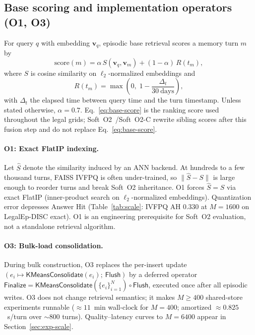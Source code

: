 \documentclass[preprint,12pt,authoryear]{elsarticle}
\begin{document}
\subsection{Base scoring and implementation operators (O1, O3)}\label{sec:o1o3}
For query $q$ with embedding $\mathbf{v}_q$, episodic base retrieval scores a memory turn $m$ by
\begin{equation}\label{eq:base-score}
\mathrm{score}(m)=\alpha\, S(\mathbf{v}_q,\mathbf{v}_m)+(1-\alpha)\, R(t_m),
\end{equation}
where $S$ is cosine similarity on $\ell_2$-normalized embeddings and
\begin{equation}
R(t_m)=\max\!\left(0,\;1-\frac{\Delta_t}{30\ \mathrm{days}}\right),
\end{equation}
with $\Delta_t$ the elapsed time between query time and the turn timestamp.
Unless stated otherwise, $\alpha{=}0.7$.
Eq.~\eqref{eq:base-score} is the ranking score used throughout the legal grids; Soft~O2~/Soft~O2-C rewrite sibling scores after this fusion step and do not replace Eq.~\eqref{eq:base-score}.

\paragraph{O1: Exact FlatIP indexing.}
Let $\widehat{S}$ denote the similarity induced by an ANN backend.
At hundreds to a few thousand turns, FAISS IVFPQ is often under-trained, so $\|\widehat{S}-S\|$ is large enough to reorder turns and break Soft~O2 inheritance.
O1 forces $\widehat{S}=S$ via exact FlatIP (inner-product search on $\ell_2$-normalized embeddings).
Quantization error depresses Answer Hit (Table~\ref{tab:scale}: IVFPQ AH $0.330$ at $M{=}1600$ on LegalEp-DISC exact).
O1 is an engineering prerequisite for Soft~O2 evaluation, not a standalone retrieval algorithm.

\paragraph{O3: Bulk-load consolidation.}
During bulk construction, O3 replaces the per-insert update
$(e_i\mapsto \mathsf{KMeansConsolidate}(e_i);\ \mathsf{Flush})$
by a deferred operator
$\mathsf{Finalize}=\mathsf{KMeansConsolidate}(\{e_i\}_{i=1}^{N})\circ\mathsf{Flush}$,
executed once after all episodic writes.
O3 does not change retrieval semantics; it makes $M{\ge}400$ shared-store experiments runnable ($\approx 11$~min wall-clock for $M{=}400$; amortized $\approx 0.825$~s/turn over $\sim 800$ turns).
Quality--latency curves to $M{=}6400$ appear in Section~\ref{sec:exp-scale}.
\end{document}
